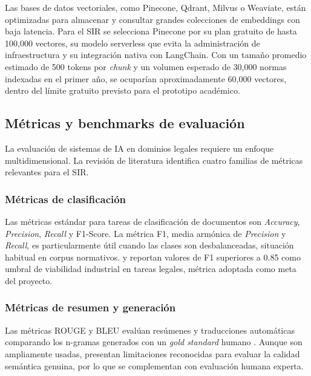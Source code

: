 \documentclass[12pt,a4paper,oneside]{report}
\begin{document}
Las bases de datos vectoriales, como Pinecone, Qdrant, Milvus o Weaviate, están optimizadas para almacenar y consultar grandes colecciones de embeddings con baja latencia. Para el SIR se selecciona Pinecone por su plan gratuito de hasta 100,000 vectores, su modelo serverless que evita la administración de infraestructura y su integración nativa con LangChain. Con un tamaño promedio estimado de 500 tokens por \textit{chunk} y un volumen esperado de 30,000 normas indexadas en el primer año, se ocuparían aproximadamente 60,000 vectores, dentro del límite gratuito previsto para el prototipo académico.

\subsection{Métricas y benchmarks de evaluación}\label{subsec:metricas-benchmarks-evaluacion}

La evaluación de sistemas de IA en dominios legales requiere un enfoque multidimensional. La revisión de literatura identifica cuatro familias de métricas relevantes para el SIR.

\subsubsection{Métricas de clasificación}\label{subsubsec:metricas-clasificacion}

Las métricas estándar para tareas de clasificación de documentos son \textit{Accuracy}, \textit{Precision}, \textit{Recall} y F1-Score. La métrica F1, media armónica de \textit{Precision} y \textit{Recall}, es particularmente útil cuando las clases son desbalanceadas, situación habitual en corpus normativos. \textcite{noronha2025} y \textcite{orosz2021} reportan valores de F1 superiores a 0.85 como umbral de viabilidad industrial en tareas legales, métrica adoptada como meta del proyecto.

\subsubsection{Métricas de resumen y generación}\label{subsubsec:metricas-resumen-generacion}

Las métricas ROUGE y BLEU evalúan resúmenes y traducciones automáticas comparando los n-gramas generados con un \textit{gold standard} humano \parencite{lin2004,papineni2002}. Aunque son ampliamente usadas, presentan limitaciones reconocidas para evaluar la calidad semántica genuina, por lo que se complementan con evaluación humana experta.
\end{document}
